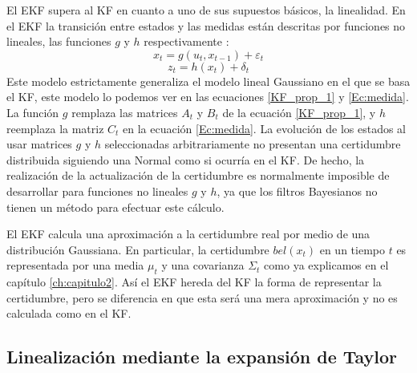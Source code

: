 El \ac{EKF} supera al \ac{KF} en cuanto a uno de sus supuestos básicos, la linealidad.
En el \ac{EKF} la transición entre estados y las medidas están descritas por funciones no lineales, las funciones $g$ y $h$ respectivamente \cite{thrun_probabilistic_2005}:
\begin{equation}\label{Ec:Estados_EKF}
x_{t}= g(u_{t},x_{t-1})+ \varepsilon_{t}
\end{equation}
\begin{equation}\label{Ec:Medida_EKF}
z_{t}= h(x_{t}) + \delta_{t}
\end{equation}
Este modelo estrictamente generaliza el modelo lineal Gaussiano en el que se basa el \ac{KF}, este modelo lo podemos ver en las ecuaciones \ref{KF_prop_1} y \ref{Ec:medida}.
La función $g$ 
remplaza las matrices $A_{t}$ y $B_{t}$ de la ecuación \ref{KF_prop_1}, y $h$ reemplaza la matriz $C_{t}$ en la ecuación \ref{Ec:medida}.
La evolución de los estados al usar matrices $g$ y $h$ seleccionadas arbitrariamente no presentan una certidumbre distribuida siguiendo una Normal como si ocurría en el \ac{KF}.
De hecho, la realización de la actualización de la certidumbre es normalmente imposible de desarrollar para funciones no lineales $g$ y $h$, ya que los filtros Bayesianos no tienen un método para efectuar este cálculo.
%
%
%
%
%

El \ac{EKF} calcula una aproximación a la certidumbre real por medio de una distribución Gaussiana.
En particular, la certidumbre $bel(x_{t})$ en un tiempo $t$ es representada por una media $\mu_{t}$ y una covarianza $\Sigma_{t}$ como ya explicamos en el capítulo \ref{ch:capitulo2}.
Así el \ac{EKF} hereda del \ac{KF} la forma de representar la certidumbre, pero se diferencia en que esta será una mera aproximación y no es calculada como en el \ac{KF}.

\subsection{Linealización mediante la expansión de Taylor }

